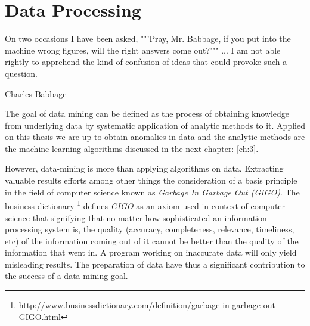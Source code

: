 \chapter{Data Processing}\label{ch:2}
\epigraph{On two occasions I have been asked, ""'Pray, Mr. Babbage, if you put into the machine wrong figures, will the right answers come out?'"" ... I am not able rightly to apprehend the kind of confusion of ideas that could provoke such a question.}{Charles Babbage}

The goal of data mining can be defined as the process of obtaining knowledge from underlying data by systematic application of analytic methods to it. Applied on this thesis we are up to obtain anomalies in data and the analytic methods are the machine learning algorithms discussed in the next chapter: \ref{ch:3}. 

However, data-mining is more than applying algorithms on data. Extracting valuable results efforts among other things the consideration of a basis principle in the field of computer science known as \textit{Garbage In Garbage Out (GIGO)}. The business dictionary \footnote{http://www.businessdictionary.com/definition/garbage-in-garbage-out-GIGO.html}  defines \textit{GIGO} as an axiom used in context of computer science that signifying that no matter how sophisticated an information processing system is, the quality (accuracy, completeness, relevance, timeliness, etc) of the information coming out of it cannot be better than the quality of the information that went in. A program working on inaccurate data will only yield misleading results. The preparation of data have thus a significant contribution to the success of a data-mining goal.

